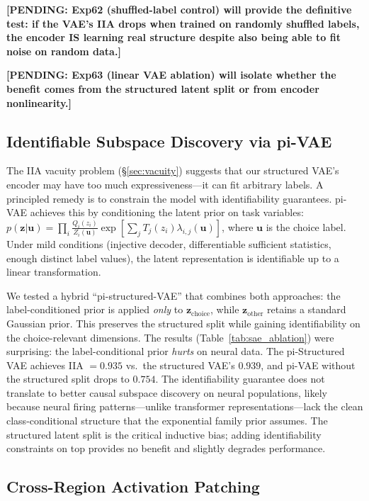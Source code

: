 \documentclass{article}
\newcommand{\pending}[1]{\textcolor{red!70!black}{\textbf{[PENDING: #1]}}}
\begin{document}
\pending{Exp62 (shuffled-label control) will provide the definitive test: if the VAE's IIA drops when trained on randomly shuffled labels, the encoder IS learning real structure despite also being able to fit noise on random data.}

\pending{Exp63 (linear VAE ablation) will isolate whether the benefit comes from the structured latent split or from encoder nonlinearity.}

\subsection{Identifiable Subspace Discovery via pi-VAE}

The IIA vacuity problem (\S\ref{sec:vacuity}) suggests that our structured VAE's encoder may have too much expressiveness---it can fit arbitrary labels. A principled remedy is to constrain the model with identifiability guarantees. pi-VAE \citep{zhou2020pivae} achieves this by conditioning the latent prior on task variables: $p(\mathbf{z}|\mathbf{u}) = \prod_i \frac{Q_i(z_i)}{Z_i(\mathbf{u})} \exp\left[\sum_j T_j(z_i) \lambda_{i,j}(\mathbf{u})\right]$, where $\mathbf{u}$ is the choice label. Under mild conditions (injective decoder, differentiable sufficient statistics, enough distinct label values), the latent representation is identifiable up to a linear transformation.

We tested a hybrid ``pi-structured-VAE'' that combines both approaches: the label-conditioned prior is applied \emph{only} to $\mathbf{z}_{\text{choice}}$, while $\mathbf{z}_{\text{other}}$ retains a standard Gaussian prior. This preserves the structured split while gaining identifiability on the choice-relevant dimensions. The results (Table~\ref{tab:sae_ablation}) were surprising: the label-conditional prior \emph{hurts} on neural data. The pi-Structured VAE achieves IIA $= 0.935$ vs.\ the structured VAE's $0.939$, and pi-VAE without the structured split drops to $0.754$. The identifiability guarantee does not translate to better causal subspace discovery on neural populations, likely because neural firing patterns---unlike transformer representations---lack the clean class-conditional structure that the exponential family prior assumes. The structured latent split is the critical inductive bias; adding identifiability constraints on top provides no benefit and slightly degrades performance.

\subsection{Cross-Region Activation Patching}
\end{document}
